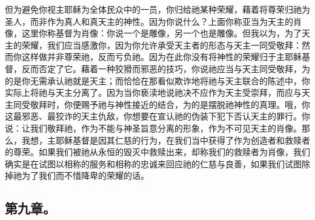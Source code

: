 但为避免你视主耶稣为全体民众中的一员，你归给祂某种荣耀，藉着将尊荣归祂为圣人，而非作为真人和真天主的神性。因为你说什么？上面你称亚当为天主的肖像，这里你称基督为肖像：你说一个是雕像，另一个也是雕像。但我以为，为了天主的荣耀，我们应当感激你，因为你允许承受天主者的形态与天主一同受敬拜：然而你这样做并非尊荣祂，反而亏负祂。因为在此你没有将神性的荣耀归于主耶稣基督，反而否定了它。藉着一种狡猾而邪恶的技巧，你说祂应当与天主同受敬拜，为的是你无需承认祂就是天主；而恰恰在那看似欺诈地将祂与天主联合的陈述中，你实际上将祂与天主分离了。因为当你亵渎地说祂决不应作为天主受崇拜，而应与天主同受敬拜时，你便赐予祂与神性接近的结合，为的是摆脱祂神性的真理。哦，你这最邪恶、最狡诈的天主仇敌，你想要在宣认祂的伪装下犯下否认天主的罪行。你说：让我们敬拜祂，作为不能与神圣旨意分离的形象，作为不可见天主的肖像。那么，我想，主耶稣基督是因其仁慈的行为，在我们当中获得了作为创造者和救赎者的尊荣。如果我们被祂从永恒的毁灭中救赎出来，却称我们的救赎者为肖像，我们确实是在试图以相称的服务和相称的忠诚来回应祂的仁慈与良善，如果我们试图除掉祂为了我们而不惜降卑的荣耀的话。\par


\subsection{第九章。}

\par

